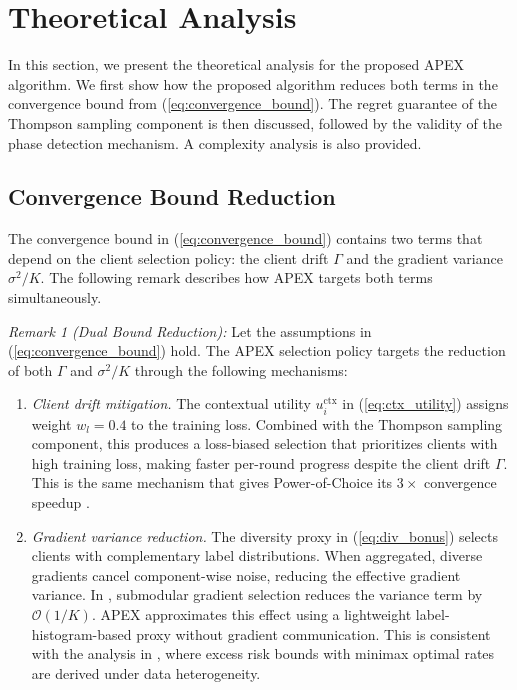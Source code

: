\documentclass[journal]{IEEEtran}
\begin{document}
\section{Theoretical Analysis}

In this section, we present the theoretical analysis for the proposed APEX algorithm. We first show how the proposed algorithm reduces both terms in the convergence bound from (\ref{eq:convergence_bound}). The regret guarantee of the Thompson sampling component is then discussed, followed by the validity of the phase detection mechanism. A complexity analysis is also provided.

\subsection{Convergence Bound Reduction}

The convergence bound in (\ref{eq:convergence_bound}) contains two terms that depend on the client selection policy: the client drift $\Gamma$ and the gradient variance $\sigma^2/K$. The following remark describes how APEX targets both terms simultaneously.

\textit{Remark 1 (Dual Bound Reduction):} Let the assumptions in (\ref{eq:convergence_bound}) hold. The APEX selection policy targets the reduction of both $\Gamma$ and $\sigma^2/K$ through the following mechanisms:

\begin{enumerate}
    \item[(a)] \textit{Client drift mitigation.} The contextual utility $u_i^{\text{ctx}}$ in (\ref{eq:ctx_utility}) assigns weight $w_l = 0.4$ to the training loss. Combined with the Thompson sampling component, this produces a loss-biased selection that prioritizes clients with high training loss, making faster per-round progress despite the client drift $\Gamma$. This is the same mechanism that gives Power-of-Choice its $3\times$ convergence speedup \cite{cho2022towards}.

    \item[(b)] \textit{Gradient variance reduction.} The diversity proxy in (\ref{eq:div_bonus}) selects clients with complementary label distributions. When aggregated, diverse gradients cancel component-wise noise, reducing the effective gradient variance. In \cite{balakrishnan2022diverse}, submodular gradient selection reduces the variance term by $\mathcal{O}(1/K)$. APEX approximates this effect using a lightweight label-histogram-based proxy without gradient communication. This is consistent with the analysis in \cite{zhang2026fednkrf}, where excess risk bounds with minimax optimal rates are derived under data heterogeneity.
\end{enumerate}
\end{document}
